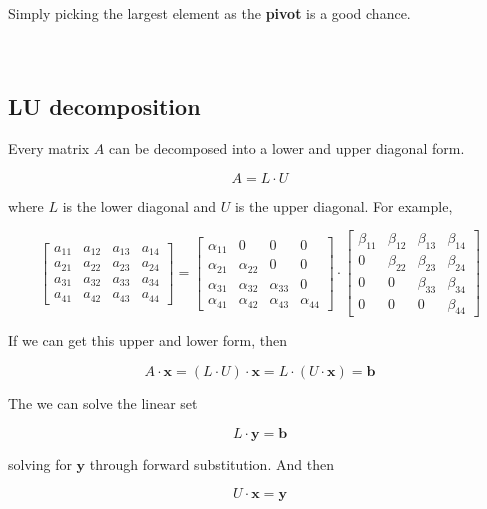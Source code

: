 \documentclass[]{article}
\begin{document}
Simply picking the largest element as the \textbf{pivot} is a good chance.\\\\\\



\subsection{LU decomposition}\bigbreak

Every matrix $A$ can be decomposed into a lower and upper diagonal form.

\[A = L \cdot U \]

where $L$ is the lower diagonal and $U$ is the upper diagonal. For example, 

\[
\begin{bmatrix}
	a_{11}       & a_{12} & a_{13} & a_{14}\\
	a_{21}       & a_{22} & a_{23} & a_{24}\\
	a_{31}       & a_{32} & a_{33} & a_{34}\\
	a_{41}       & a_{42} & a_{43} & a_{44}
\end{bmatrix}=
\begin{bmatrix}
	\alpha_{11}       & 0 & 0 & 0 \\
	\alpha_{21}       & \alpha_{22} & 0 & 0 \\
	\alpha_{31}       & \alpha_{32} & \alpha_{33} & 0 \\
	\alpha_{41}       & \alpha_{42} & \alpha_{43} & \alpha_{44}
\end{bmatrix}\cdot
\begin{bmatrix}
\beta_{11}       & \beta_{12} & \beta_{13} & \beta_{14}\\
0       & \beta_{22} & \beta_{23} & \beta_{24}\\
0       & 0 & \beta_{33} & \beta_{34}\\
0      & 0 & 0 & \beta_{44}
\end{bmatrix}
\]


If we can get this upper and lower form, then 

\[A\cdot\bm{x} = (L \cdot U)\cdot \bm{x} = L\cdot(U\cdot\bm{x}) = \bm{b}\]

The we can solve the linear set 

\[ L\cdot\bm{y} = \bm{b}\]

solving for $\bm{y}$ through forward substitution. And then 

\[ U\cdot\bm{x} = \bm{y}\]
\end{document}
